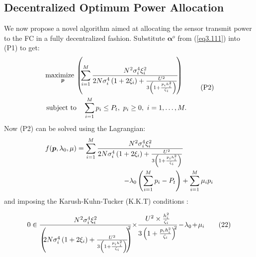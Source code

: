 \documentclass[conference]{IEEEtran}
\begin{document}
\subsection{Decentralized Optimum Power Allocation}
\label{sec:pagestyle}
We now propose a novel algorithm aimed at allocating the sensor transmit power to the FC in a fully decentralized fashion. Substitute $\boldsymbol \alpha^o$ from (\ref{eq3.111}) into (P1) to get:
\begin{equation*}\label{eq202}
\begin{aligned}
& \underset{\boldsymbol p}{\text{\hspace{-0.3cm}maximize}}
& &\hspace{-0.4cm}\left(\hspace{-0.1cm}\sum \limits_{i=1}^M\frac{ N^2 \sigma_i^{4}\xi_i ^{2}}{ {   2N  \sigma_i^{4} \left(1+2\xi_i \right) +\frac{U^{2}}{3\left(1+\frac{p_ih_i^{2}}{\zeta_i}\right)}}}\hspace{-0.1cm}\right) \\ \quad
& \text{\hspace{-0.25cm}subject to} 
& & \sum \limits_{i=1}^M p_i \leq P_t, \ p_i\geq0, \ i = 1, \ldots, M.
\end{aligned}
\tag{{P2}}
\end{equation*}
Now (P2) can be solved using the Lagrangian:
\begin{align*}
   f(\boldsymbol p, \lambda_0, \mu)={ \sum \limits_{i=1}^M \frac{ N^2 \sigma_i^{4}\xi_i ^{2}}{ 2N  \sigma_i^{4} \left(1+2\xi_i \right) +\frac{U^{2}}{3\left(1+\frac{p_ih_i^{2}}{\zeta_i}\right)}} } \hspace{1.5cm}\\ -\lambda_0 \left(\sum \limits_{i=1}^M p_i- P_t\right)+\sum \limits_{i=1}^M \mu_i p_i 
\end{align*}
and imposing the Karush-Kuhn-Tucker (K.K.T) conditions \cite{Boyd_2}:
\vspace{-0.5cm}
\begin{center}
\begin{align*}\label{eq21}
 0\in\frac{ N^2 \sigma_i^{4}\xi_i ^{2}}{ \left(\hspace{-0.14cm}2N  \sigma_i^{4} \left(1+2\xi_i \right) +\frac{U^{2}}{3\left(1+\frac{p_ih_i^{2}}{\zeta_i}\right)}\hspace{-0.1cm}\right)^{\hspace{-0.22cm}2}  }\hspace{-0.07cm}\times\hspace{-0.07cm} \frac{U^{2}\times \frac{h_i^{2}}{\zeta_i}}{3\left(1+\frac{p_ih_i^{2}}{\zeta_i}\right)^{\hspace{-0.1cm}2}} \hspace{-0.05cm}-\hspace{-0.05cm}\lambda_0 \hspace{-0.05cm}+\hspace{-0.05cm}\mu_i 
\tag{22}
\end{align*}
\end{center}
\end{document}
